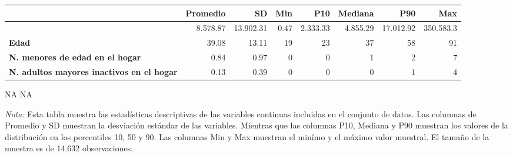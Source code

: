 \centering \footnotesize \setlength{\tabcolsep}{4pt} \renewcommand{\arraystretch}{0.8}
\begingroup
\fontsize{7.0pt}{8.5pt}\selectfont
\begin{longtable}{lrrrrrrr}
\toprule
  & Promedio & SD & Min & P10 & Mediana & P90 & Max \\ 
\midrule\addlinespace[2.5pt]
{\bfseries Ingresos laborales por hora} & 8.578.87 & 13.902.31 & 0.47 & 2.333.33 & 4.855.29 & 17.012.92 & 350.583.3 \\ 
{\bfseries Edad} & 39.08 & 13.11 & 19 & 23 & 37 & 58 & 91 \\ 
{\bfseries N. menores de edad en el hogar} & 0.84 & 0.97 & 0 & 0 & 1 & 2 & 7 \\ 
{\bfseries N. adultos mayores inactivos en el hogar} & 0.13 & 0.39 & 0 & 0 & 0 & 1 & 4 \\ 
\bottomrule
\end{longtable}
\endgroup

NA
NA
\begin{minipage}{0.8\textwidth}
                                   \begin{tablenotes}
                                   \item \footnotesize \textit{Nota:} Esta tabla muestra las estadísticas descriptivas de las variables continuas incluidas en el conjunto de datos.
                                   Las columnas de Promedio y SD muestran la desviación estándar de las variables. Mientras que las columnas P10, Mediana y P90 muestran los valores de la distribución en los percentiles 10, 50 y 90.
                                   Las columnas Min y Max muestran el minímo y el máximo valor muestral.
                                   El tamaño de la muestra es de 14.632 observaciones.
                                   \end{tablenotes}
                                   \end{minipage}
